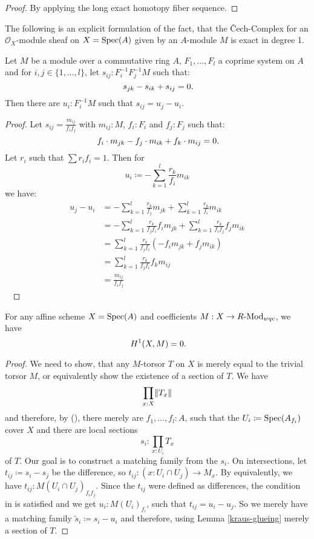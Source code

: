 \begin{proof}
  By applying the long exact homotopy fiber sequence.
\end{proof}

The following is an explicit formulation of the fact, that the Čech-Complex for an
$\mathcal{O}_X$-module sheaf on $X=\operatorname{Spec}(A)$ given by an $A$-module $M$ is exact in degree 1.
\begin{lemma}%
  \label{H1-algebra}
  Let $M$ be a module over a commutative ring $A$, $F_1,\dots,F_l$ a coprime system on $A$
  and for $i,j\in\{1,\dots,l\}$, let $s_{ij} : F_i^{-1} F_j^{-1} M$ such that:
  \[ s_{jk}-s_{ik}+s_{ij}=0 \rlap{.}\]
  Then there are $u_i:F_i^{-1}M$ such that $s_{ij}=u_j - u_i$.
\end{lemma}

\begin{proof}
  Let $s_{ij}=\frac{m_{ij}}{f_i f_j}$ with $m_{ij}:M$, $f_i:F_i$ and $f_j:F_j$ such that:
  \[ f_i\cdot m_{jk}-f_j\cdot m_{ik}+f_k\cdot m_{ij}=0 \rlap{.}\]
  Let $r_i$ such that $\sum r_i f_i =1$.
  Then for
  \[ u_i \coloneqq -\sum_{k=1}^l\frac{r_k}{f_i}m_{ik} \]
  we have:
  \begin{align*}
      u_j-u_i &= -\sum_{k=1}^l\frac{r_k}{f_j}m_{jk} + \sum_{k=1}^l\frac{r_k}{f_i}m_{ik} \\
              &= -\sum_{k=1}^l\frac{r_k}{f_j f_i}f_i m_{jk} + \sum_{k=1}^l\frac{r_k}{f_i f_j} f_j m_{ik} \\
              &= \sum_{k=1}^l\frac{r_k}{f_j f_i}(-f_i m_{jk} + f_j m_{ik}) \\
              &= \sum_{k=1}^l\frac{r_k}{f_j f_i}f_k m_{ij} \\
              &= \frac{m_{ij}}{f_i f_j}
  \end{align*}
  \ %
\end{proof}

\begin{theorem}%
  \label{H1-wqc-module-affine-trivial}
  For any affine scheme $X=\operatorname{Spec}(A)$ and coefficients $M: X\to R\text{-}\mathrm{Mod}_{wqc}$, we have
  \[ H^1(X,M)=0 \rlap{.} \]
\end{theorem}

\begin{proof}
  We need to show, that any $M$-torsor $T$ on $X$ is merely equal to the trivial torsor $M$,
  or equivalently show the existence of a section of $T$.
  We have
  \[ \prod_{x:X}\lVert  T_x  \rVert\]
  and therefore, by (),
  there merely are $f_1,\dots,f_l:A$,
  such that the $U_i\coloneqq \operatorname{Spec}(A_{f_i})$ cover $X$ and
  there are local sections
  \[ s_i:\prod_{x:U_i}T_x\]
  of $T$. Our goal is to construct a matching family from the $s_i$.
  On intersections, let $t_{ij}\coloneqq s_i-s_j$ be the difference, so $t_{ij}:(x : U_i\cap U_j) \to M_x$.
  By  equivalently,
  we have $t_{ij}:M(U_{i}\cap U_j)_{f_i f_j}$.
  Since the $t_{ij}$ were defined as differences,
  the condition in  is satisfied and we get
  $u_i:M(U_i)_{f_i}$, such that $t_{ij}=u_i-u_j$.
  So we merely have a matching family $\tilde{s}_i\coloneqq s_i-u_i$ and therefore, using Lemma \ref{kraus-glueing} merely a section of $T$.
\end{proof}

